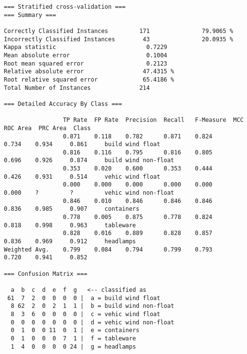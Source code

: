 \documentclass[a4paper]{article}
\begin{document}
\begin{verbatim}
=== Stratified cross-validation ===
=== Summary ===

Correctly Classified Instances         171               79.9065 %
Incorrectly Classified Instances        43               20.0935 %
Kappa statistic                          0.7229
Mean absolute error                      0.1004
Root mean squared error                  0.2123
Relative absolute error                 47.4315 %
Root relative squared error             65.4186 %
Total Number of Instances              214

=== Detailed Accuracy By Class ===

                 TP Rate  FP Rate  Precision  Recall   F-Measure  MCC      ROC Area  PRC Area  Class
                 0.871    0.118    0.782      0.871    0.824      0.734    0.934     0.861     build wind float
                 0.816    0.116    0.795      0.816    0.805      0.696    0.926     0.874     build wind non-float
                 0.353    0.020    0.600      0.353    0.444      0.426    0.931     0.514     vehic wind float
                 0.000    0.000    0.000      0.000    0.000      0.000    ?         ?         vehic wind non-float
                 0.846    0.010    0.846      0.846    0.846      0.836    0.985     0.907     containers
                 0.778    0.005    0.875      0.778    0.824      0.818    0.998     0.963     tableware
                 0.828    0.016    0.889      0.828    0.857      0.836    0.969     0.912     headlamps
Weighted Avg.    0.799    0.084    0.794      0.799    0.793      0.720    0.941     0.852

=== Confusion Matrix ===

  a  b  c  d  e  f  g   <-- classified as
 61  7  2  0  0  0  0 |  a = build wind float
  8 62  2  0  2  1  1 |  b = build wind non-float
  8  3  6  0  0  0  0 |  c = vehic wind float
  0  0  0  0  0  0  0 |  d = vehic wind non-float
  0  1  0  0 11  0  1 |  e = containers
  0  1  0  0  0  7  1 |  f = tableware
  1  4  0  0  0  0 24 |  g = headlamps

\end{verbatim}


\end{document}
